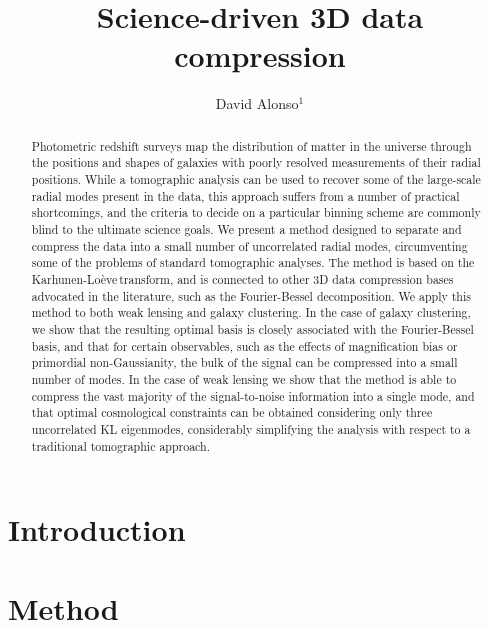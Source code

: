 \documentclass[twocolumn,amsfont,amssymb,amsmath, showpacs,balancelastpage, nofootinbib]{revtex4-1}
\newcommand{\kalo}{Karhunen-Lo\`{e}ve\,}
\begin{document}
\title{Science-driven 3D data compression}
\author{David Alonso$^1$}

\begin{abstract}
  Photometric redshift surveys map the distribution of matter in the universe through the positions and shapes of galaxies with poorly resolved measurements of their radial positions. While a tomographic analysis can be used to recover some of the large-scale radial modes present in the data, this approach suffers from a number of practical shortcomings, and the criteria to decide on a particular binning scheme are commonly blind to the ultimate science goals. We present a method designed to separate and compress the data into a small number of uncorrelated radial modes, circumventing some of the problems of standard tomographic analyses. The method is based on the \kalo transform, and is connected to other 3D data compression bases advocated in the literature, such as the Fourier-Bessel decomposition. We apply this method to both weak lensing and galaxy clustering. In the case of galaxy clustering, we show that the resulting optimal basis is closely associated with the Fourier-Bessel basis, and that for certain observables, such as the effects of magnification bias or primordial non-Gaussianity, the bulk of the signal can be compressed into a small number of modes. In the case of weak lensing we show that the method is able to compress the vast majority of the signal-to-noise information into a single mode, and that optimal cosmological constraints can be obtained considering only three uncorrelated KL eigenmodes, considerably simplifying the analysis with respect to a traditional tomographic approach.
\end{abstract}

\maketitle

\section{Introduction}\label{sec:intro}
\lipsum[1]

\section{Method}\label{sec:method}
\end{document}
